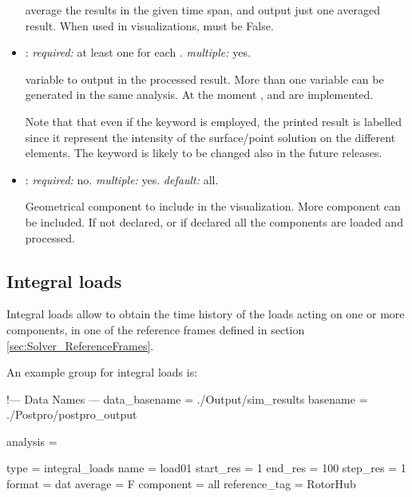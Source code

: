 \begin{itemize}
average the results in the given time span, and output just one averaged result. 
When used in visualizations,  must be False.

\item {}: \textit{required:} at least one for each . 
\textit{multiple:} yes.

variable to output in the processed result. More than one variable can be generated 
in the same analysis. At the moment ,  and 
 are implemented.

Note that that even if the keyword  is employed, the printed result 
is labelled  since it represent the intensity of the 
surface/point solution on the different elements. The keyword is likely to 
be changed also in the future releases.

\item {}: \textit{required:} no. \textit{multiple:} yes. \textit{default:} all.

Geometrical component to include in the visualization. More component can be included. 
If not declared, or if declared  all the components are loaded and processed. 
\end{itemize}

\subsection{Integral loads}

Integral loads allow to obtain the time history of the loads acting on one 
or more components, in one of the reference frames defined in section 
\ref{sec:Solver_ReferenceFrames}.

An example  group for integral loads is:

\begin{inputfile}[frame=single, caption={dust\_post.in for integral loads}, 
  label={file:dust_post.in_load}]
!--- Data Names ---
data_basename = ./Output/sim_results
basename =     ./Postpro/postpro_output

analysis = {

type = integral_loads
name = load01
start_res = 1
end_res   = 100 
step_res  = 1
format = dat
average = F
component = all
reference_tag = RotorHub

}
\end{inputfile}


